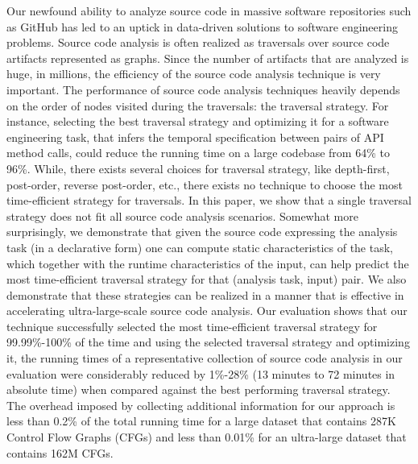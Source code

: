 Our newfound ability to analyze source code in massive software
repositories such as GitHub has led to an uptick in data-driven
solutions to software engineering problems. Source code analysis is
often realized as traversals over source code artifacts represented as
graphs. Since the number of artifacts that are analyzed is huge, in
millions, the efficiency of the source code analysis technique is very
important. The performance of source code analysis techniques heavily
depends on the order of nodes visited during the traversals: the
traversal strategy. For instance, selecting the best traversal strategy and optimizing it for a software engineering task, that infers the temporal specification between pairs of API method calls, could reduce the running time on a large codebase from 64\% to 96\%. 
While, there exists several choices for traversal strategy, like depth-first, post-order, reverse post-order, etc., there exists no technique to choose the most time-efficient strategy for traversals. In this paper, we show that a single traversal strategy does not fit all source code analysis scenarios. Somewhat more
surprisingly, we demonstrate that given the source code expressing the
analysis task (in a declarative form) one can compute static
characteristics of the task, which together with the runtime
characteristics of the input, can help predict the most time-efficient
traversal strategy for that (analysis task, input) pair. We also
demonstrate that these strategies can be realized in a manner that is
effective in accelerating ultra-large-scale source code analysis. Our
evaluation shows that our technique successfully selected the most
time-efficient traversal strategy for 99.99\%-100\% of the time and
using the selected traversal strategy and optimizing it, the running times of a
representative collection of source code analysis in our evaluation
were considerably reduced by 1\%-28\% (13 minutes to 72 minutes in absolute time) when compared against the best performing traversal strategy. The overhead imposed by
collecting additional information for our approach is less than
0.2\% of the total running time for a large dataset that contains 287K
Control Flow Graphs (CFGs) and less than 0.01\% for an ultra-large
dataset that contains 162M CFGs.